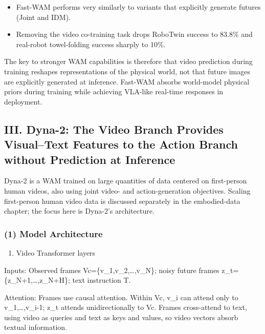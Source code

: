 \begin{itemize}
\tightlist
\item
  Fast-WAM performs very similarly to variants that explicitly generate futures (Joint and IDM).
\item
  Removing the video co-training task drops RoboTwin success to 83.8\% and real-robot towel-folding success sharply to 10\%.
\end{itemize}

The key to stronger WAM capabilities is therefore that video prediction during training reshapes representations of the physical world, not that future images are explicitly generated at inference. Fast-WAM absorbs world-model physical priors during training while achieving VLA-like real-time responses in deployment.

\hypertarget{iii.-dyna-2-the-video-branch-provides-visualtext-features-to-the-action-branch-without-prediction-at-inference}{%
\subsection{III. Dyna-2: The Video Branch Provides Visual--Text Features to the Action Branch without Prediction at Inference}\label{iii.-dyna-2-the-video-branch-provides-visualtext-features-to-the-action-branch-without-prediction-at-inference}}

Dyna-2 is a WAM trained on large quantities of data centered on first-person human videos, also using joint video- and action-generation objectives. Scaling first-person human video data is discussed separately in the embodied-data chapter; the focus here is Dyna-2's architecture.

\hypertarget{model-architecture-3}{%
\subsubsection{(1) Model Architecture}\label{model-architecture-3}}

\begin{enumerate}
\def\labelenumi{\arabic{enumi}.}
\tightlist
\item
  Video Transformer layers
\end{enumerate}

Inputs: Observed frames Vc=\{v\_1,v\_2,\ldots,v\_N\}; noisy future frames z\_t=\{z\_N+1,\ldots,z\_N+H\}; text instruction T.

Attention: Frames use causal attention. Within Vc, v\_i can attend only to v\_1,\ldots,v\_i-1; z\_t attends unidirectionally to Vc. Frames cross-attend to text, using video as queries and text as keys and values, so video vectors absorb textual information.

